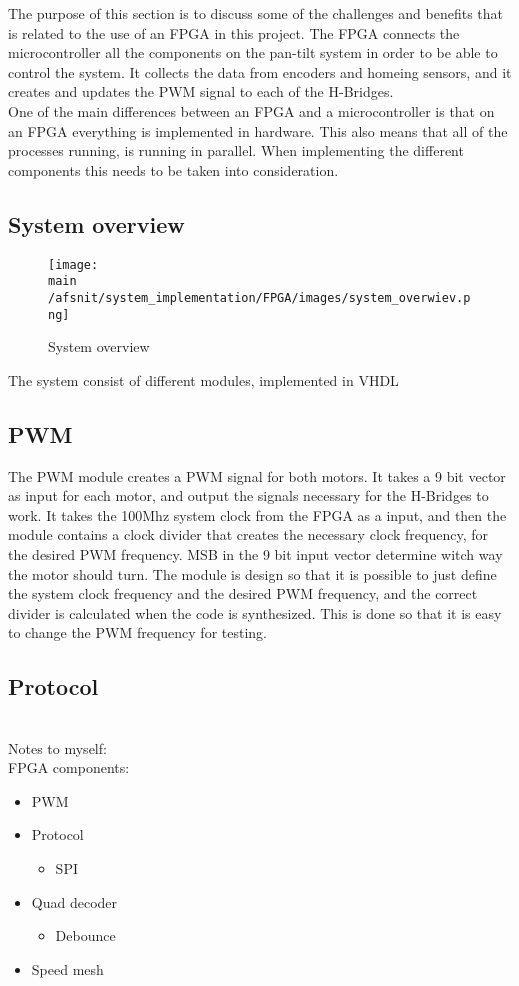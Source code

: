 \documentclass[../../../main]{subfiles}
\begin{document}
The purpose of this section is to discuss some of the challenges and benefits that is related to the use of an FPGA in this project.
The FPGA connects the  microcontroller all the components on the pan-tilt system in order to be able to control the system. It collects the data from encoders and homeing sensors, and it creates and updates the PWM signal to each of the H-Bridges.
\\
One of the main differences between an FPGA and a microcontroller is that on an FPGA everything is implemented in hardware. This also means that all of the processes running, is running in parallel. When implementing the different components this needs to be taken into consideration.
\subsection{System overview}%
\label{sub:system_overview}
\begin{figure}[H] 
    \texttt{[image: \\main /afsnit/system\_implementation/FPGA/images/system\_overwiev.png]}
    \caption {System overview}
    \label{fig:system_overview_FPGA}
\end{figure}
The system consist of different modules, implemented in VHDL 
\subsection{PWM}
The PWM module creates a PWM signal for both motors. It takes a 9 bit vector as input for each motor, and output the signals necessary for the H-Bridges to work. 
It takes the 100Mhz system clock from the FPGA as a input, and then the module contains a clock divider that creates the necessary clock frequency, for the desired PWM frequency. 
MSB in the 9 bit input vector determine witch way the motor should turn. 
The module is design so that it is possible to just define the system clock frequency and the desired PWM frequency, and the correct divider is calculated when the code is synthesized.
This is done so that it is easy to change the PWM frequency for testing.
\subsection{Protocol}

\\
Notes to myself:\\
FPGA components:
\begin{itemize}
    \item PWM
    \item Protocol
        \begin{itemize}
            \item SPI
        \end{itemize} 
    \item Quad decoder
        \begin{itemize}
            \item Debounce
        \end{itemize}
    \item Speed mesh
\end{itemize}

\end{document}
